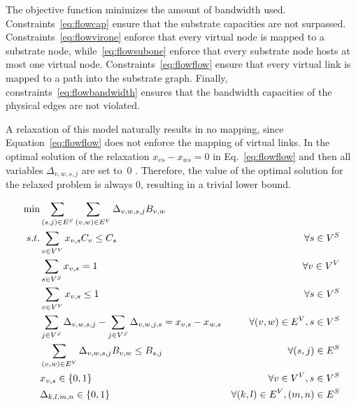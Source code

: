 \documentclass[12pt]{article}
\begin{document}


The objective function minimizes the amount of bandwidth used. 
Constraints~\eqref{eq:flowcap} ensure that the substrate capacities are not surpassed. 
Constraints~\eqref{eq:flowvirone} enforce that every virtual node is mapped to a substrate node, while~\eqref{eq:flowsubone} enforce that every substrate node hosts at most one virtual node. 
Constraints~\eqref{eq:flowflow}
ensure that every virtual link is mapped to a path into the substrate graph. Finally, constraints~\eqref{eq:flowbandwidth} ensures that the bandwidth capacities of the physical edges are not violated.

A relaxation of this model naturally results in no mapping, since Equation~\eqref{eq:flowflow} does not enforce the mapping of virtual links. 
In the optimal solution of the relaxation $x_{vs}-x_{ws}=0$ in Eq.~\ref{eq:flowflow}  and then
all variables $\Delta_{v,w,s,j}$ are set to~$0$ . 
Therefore, the value of the optimal solution for the relaxed problem is always $0$, resulting in a trivial lower bound.


\begin{align}
  \scriptsize
    \min & \sum\limits_{(s,j) \in E^{S}} \sum\limits_{(v,w) \in E^{V}} \Delta_{v,w,s,j} B_{v,w} \nonumber \\
    s.t. & \sum\limits_{v \in V^{V}} x_{v,s} C_{v} \leq C_{s}                     & \forall s \in V^{S}  \label{eq:flowcap} \\
    & \sum\limits_{s \in V^{S}} x_{v,s} = 1                                  & \forall v \in V^{V}  \label{eq:flowvirone}\\
         & \sum\limits_{v \in V^{V}} x_{v,s} \leq 1                               & \forall s \in V^{S} \label{eq:flowsubone}\\
         & \sum\limits_{j \in V^{S}} \Delta_{v,w,s,j} - \sum\limits_{j \in V^{S}} \Delta_{v,w,j,s} = x_{v,s} - x_{w,s}  & \forall (v,w) \in E^{V}, s \in V^{S}\label{eq:flowflow} \\
         & \sum\limits_{(v,w) \in E^{V}} \Delta_{v,w,s,j} B_{v,w} \leq B_{s,j}  & \forall (s,j) \in E^{S} \label{eq:flowbandwidth} \\
         & x_{v,s} \in \{0,1\} & \forall v \in V^{V}, s \in V^{S} \\
         & \Delta_{k,l,m,n} \in \{0,1\} & \forall (k,l) \in E^{V}, (m,n) \in E^{S}
\end{align} 
\end{document}
